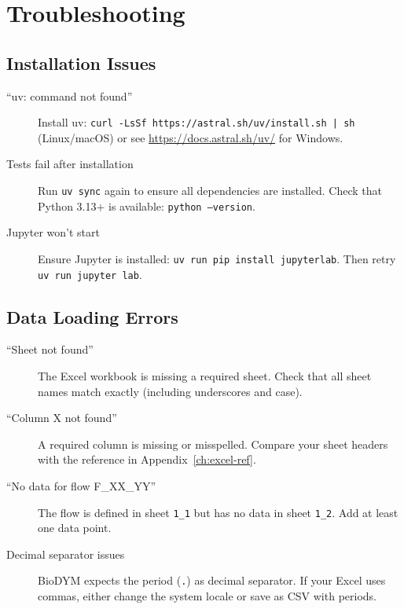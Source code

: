 \chapter{Troubleshooting}
\label{ch:troubleshooting}

\section{Installation Issues}

\begin{description}
  \item[``uv: command not found''] Install uv: \texttt{curl -LsSf https://astral.sh/uv/install.sh | sh} (Linux/macOS) or see \url{https://docs.astral.sh/uv/} for Windows.

  \item[Tests fail after installation] Run \texttt{uv sync} again to ensure all dependencies are installed. Check that Python 3.13+ is available: \texttt{python --version}.

  \item[Jupyter won't start] Ensure Jupyter is installed: \texttt{uv run pip install jupyterlab}. Then retry \texttt{uv run jupyter lab}.
\end{description}

\section{Data Loading Errors}

\begin{description}
  \item[``Sheet not found''] The Excel workbook is missing a required sheet. Check that all sheet names match exactly (including underscores and case).

  \item[``Column X not found''] A required column is missing or misspelled. Compare your sheet headers with the reference in Appendix~\ref{ch:excel-ref}.

  \item[``No data for flow F\_XX\_YY''] The flow is defined in sheet \texttt{1\_1} but has no data in sheet \texttt{1\_2}. Add at least one data point.

  \item[Decimal separator issues] BioDYM expects the period (\texttt{.}) as decimal separator. If your Excel uses commas, either change the system locale or save as CSV with periods.
\end{description}

